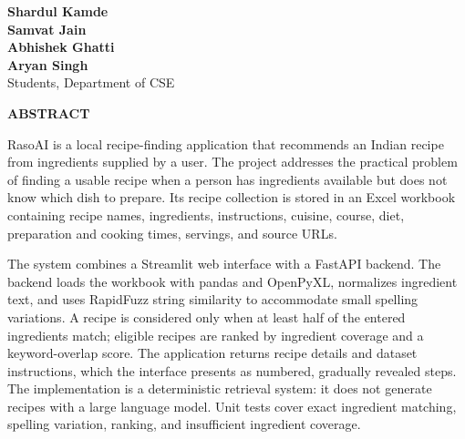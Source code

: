 \documentclass[12pt,a4paper]{report}
\begin{document}
\vspace{1\baselineskip}
\begin{flushleft}
{\fontsize{12}{14}\bfseries Shardul Kamde}\\
{\fontsize{12}{14}\bfseries Samvat Jain}\\
{\fontsize{12}{14}\bfseries Abhishek Ghatti}\\
{\fontsize{12}{14}\bfseries Aryan Singh}\\
{\fontsize{12}{14}\selectfont Students, Department of CSE}
\end{flushleft}

\clearpage

\begin{center}
{\fontsize{14}{16}\bfseries ABSTRACT}
\end{center}

\vspace{1\baselineskip}

{\fontsize{12}{14}\selectfont 
\indent RasoAI is a local recipe-finding application that recommends an Indian recipe from ingredients supplied by a user. The project addresses the practical problem of finding a usable recipe when a person has ingredients available but does not know which dish to prepare. Its recipe collection is stored in an Excel workbook containing recipe names, ingredients, instructions, cuisine, course, diet, preparation and cooking times, servings, and source URLs.

\indent The system combines a Streamlit web interface with a FastAPI backend. The backend loads the workbook with pandas and OpenPyXL, normalizes ingredient text, and uses RapidFuzz string similarity to accommodate small spelling variations. A recipe is considered only when at least half of the entered ingredients match; eligible recipes are ranked by ingredient coverage and a keyword-overlap score. The application returns recipe details and dataset instructions, which the interface presents as numbered, gradually revealed steps. The implementation is a deterministic retrieval system: it does not generate recipes with a large language model. Unit tests cover exact ingredient matching, spelling variation, ranking, and insufficient ingredient coverage.
}

\clearpage

\begingroup
{}
\small
\tableofcontents
\endgroup

\clearpage
\end{document}
